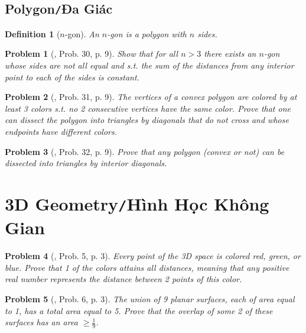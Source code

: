 \documentclass[oneside]{book}
\numberwithin{equation}{section}
\newtheorem{definition}{Definition}[section]
\newtheorem{problem}{Problem}[section]
\begin{document}
\subsection{Polygon\texttt{/}Đa Giác}

\begin{definition}[$n$-gon]
	An \emph{$n$-gon} is a polygon with $n$ sides.
\end{definition}

\begin{problem}[\cite{Gelca_Andreescu2017}, Prob. 30, p. 9]
	Show that for all $n > 3$ there exists an $n$-gon whose sides are not all equal and s.t. the sum of the distances from any interior point to each of the sides is constant.
\end{problem}

\begin{problem}[\cite{Gelca_Andreescu2017}, Prob. 31, p. 9]
	The vertices of a convex polygon are colored by at least 3 colors s.t. no 2 consecutive vertices have the same color. Prove that one can dissect the polygon into triangles by diagonals that do not cross and whose endpoints have different colors.
\end{problem}

\begin{problem}[\cite{Gelca_Andreescu2017}, Prob. 32, p. 9]
	Prove that any polygon (convex or not) can be dissected into triangles by interior diagonals.
\end{problem}

\section{3D Geometry\texttt{/}Hình Học Không Gian}

\begin{problem}[\cite{Gelca_Andreescu2017}, Prob. 5, p. 3]
	Every point of the 3D space is colored red, green, or blue. Prove that 1 of the colors attains all distances, meaning that any positive real number represents the distance between 2 points of this color.
\end{problem}

\begin{problem}	[\cite{Gelca_Andreescu2017}, Prob. 6, p. 3]
	The union of 9 planar surfaces, each of area equal to 1, has a total area equal to 5. Prove that the overlap of some 2 of these surfaces has an area $\ge\frac{1}{9}$.
\end{problem}

\end{document}
